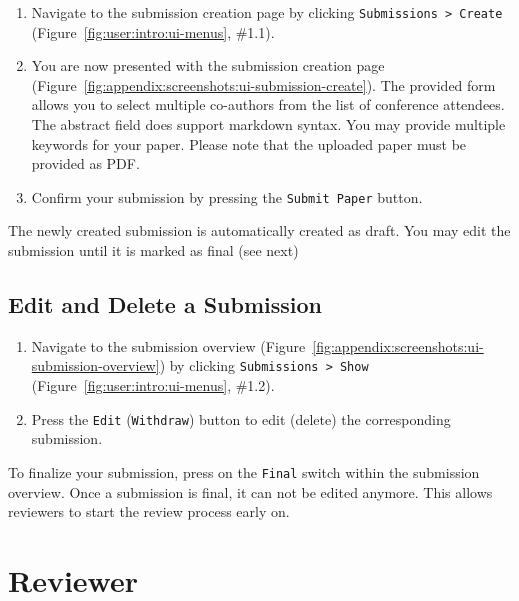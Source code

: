 \documentclass[nochapterpage,nopartpage,noheadingspace,numbersubsubsec,bigchapter,colorback,accentcolor=tud9c,10pt]{tudreport}
\begin{document}
        \begin{enumerate}
            \setlength\itemsep{0em}
            \item Navigate to the submission creation page by clicking \texttt{Submissions > Create} (Figure~\ref{fig:user:intro:ui-menus}, \#1.1).
            \item You are now presented with the submission creation page (Figure~\ref{fig:appendix:screenshots:ui-submission-create}). The provided form allows you to select multiple co-authors from the list of conference attendees. The abstract field does support markdown syntax. You may provide multiple keywords for your paper. Please note that the uploaded paper must be provided as PDF.
            \item Confirm your submission by pressing the \texttt{Submit Paper} button.
        \end{enumerate}

    \noindent
    The newly created submission is automatically created as draft. You may edit the submission until it is marked as final (see next)

  \section{Edit and Delete a Submission}
  \label{ch:user:author:edit-sbumission}

        \begin{enumerate}
            \setlength\itemsep{0em}
            \item Navigate to the submission overview (Figure~\ref{fig:appendix:screenshots:ui-submission-overview}) by clicking \texttt{Submissions > Show} (Figure~\ref{fig:user:intro:ui-menus}, \#1.2).
            \item Press the \texttt{Edit} (\texttt{Withdraw}) button to edit (delete) the corresponding submission.
        \end{enumerate}

    \noindent
    To finalize your submission, press on the \texttt{Final} switch within the submission overview. Once a submission is final, it can not be edited anymore. This allows reviewers to start the review process early on.

  \chapter{Reviewer}
  \label{ch:user:reviewer}
\end{document}
